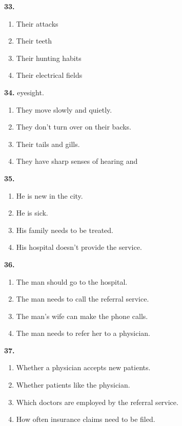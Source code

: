 \documentclass[12pt]{article}
\begin{document}
\vspace{0.25\baselineskip}
\noindent\textbf{33.}
\begin{enumerate}[label=(\Alph*),leftmargin=*,itemsep=0.2em]
\item Their attacks
\item Their teeth
\item Their hunting habits
\item Their electrical fields
\end{enumerate}
\par
\vspace{0.25\baselineskip}
\noindent\textbf{34.} eyesight.
\begin{enumerate}[label=(\Alph*),leftmargin=*,itemsep=0.2em]
\item They move slowly and quietly.
\item They don't turn over on their backs.
\item Their tails and gills.
\item They have sharp senses of hearing and
\end{enumerate}
\par
\vspace{0.25\baselineskip}
\noindent\textbf{35.}
\begin{enumerate}[label=(\Alph*),leftmargin=*,itemsep=0.2em]
\item He is new in the city.
\item He is sick.
\item His family needs to be treated.
\item His hospital doesn't provide the service.
\end{enumerate}
\par
\vspace{0.25\baselineskip}
\noindent\textbf{36.}
\begin{enumerate}[label=(\Alph*),leftmargin=*,itemsep=0.2em]
\item The man should go to the hospital.
\item The man needs to call the referral service.
\item The man's wife can make the phone calls.
\item The man needs to refer her to a physician.
\end{enumerate}
\par
\vspace{0.25\baselineskip}
\noindent\textbf{37.}
\begin{enumerate}[label=(\Alph*),leftmargin=*,itemsep=0.2em]
\item Whether a physician accepts new patients.
\item Whether patients like the physician.
\item Which doctors are employed by the referral service.
\item How often insurance claims need to be filed.
\end{enumerate}
\end{document}
